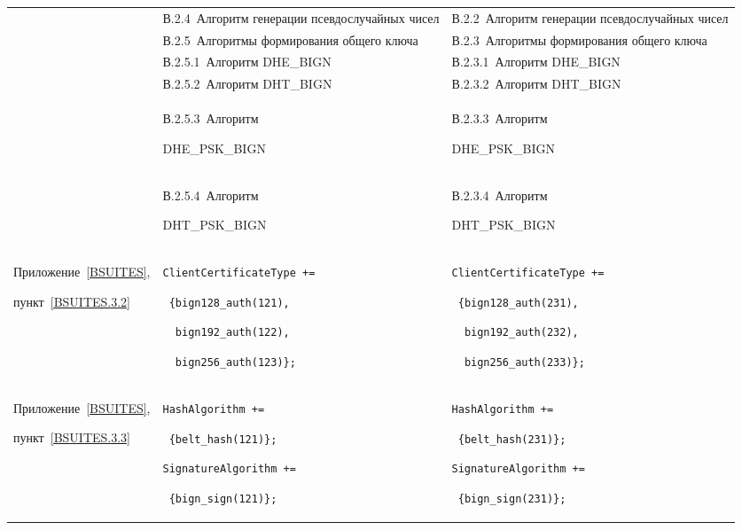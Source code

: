 \begin{center}
\begin{tabular}{|p{3.5cm}|p{6cm}|p{6cm}|}
\\
\cline{2-3}
&
В.2.4~Алгоритм генерации псевдослучайных чисел
&
В.2.2~Алгоритм генерации псевдослучайных чисел
\\
\cline{2-3}
&
В.2.5~Алгоритмы формирования общего ключа
&
В.2.3~Алгоритмы формирования общего ключа
\\
\cline{2-3}
&
В.2.5.1~Алгоритм DHE\_BIGN
&
В.2.3.1~Алгоритм DHE\_BIGN
\\
\cline{2-3}
&
В.2.5.2~Алгоритм DHT\_BIGN
&
В.2.3.2~Алгоритм DHT\_BIGN
\\
\cline{2-3}
&
В.2.5.3~Алгоритм\par DHE\_PSK\_BIGN
&
В.2.3.3~Алгоритм\par DHE\_PSK\_BIGN
\\
\cline{2-3}
&
В.2.5.4~Алгоритм\par DHT\_PSK\_BIGN
&
В.2.3.4~Алгоритм\par DHT\_PSK\_BIGN
\\
\hline
Приложение~\ref{BSUITES},\par
пункт~\ref{BSUITES.3.2} 
&
\lstinline|ClientCertificateType +=|\par
\lstinline| {bign128_auth(121),|\par
\lstinline|  bign192_auth(122),|\par
\lstinline|  bign256_auth(123)};|
&
\lstinline|ClientCertificateType +=|\par
\lstinline| {bign128_auth(231),|\par
\lstinline|  bign192_auth(232),|\par
\lstinline|  bign256_auth(233)};|
\\
\hline
Приложение~\ref{BSUITES},\par
пункт~\ref{BSUITES.3.3} 
&
\lstinline|HashAlgorithm +=|\par
\lstinline| {belt_hash(121)};|\par
\lstinline|SignatureAlgorithm +=|\par
\lstinline| {bign_sign(121)};|
&
\lstinline|HashAlgorithm +=|\par
\lstinline| {belt_hash(231)};|\par
\lstinline|SignatureAlgorithm +=|\par
\lstinline| {bign_sign(231)};|
\\
\hline
\end{tabular}
\end{center}

\vfill

\mbox{}


